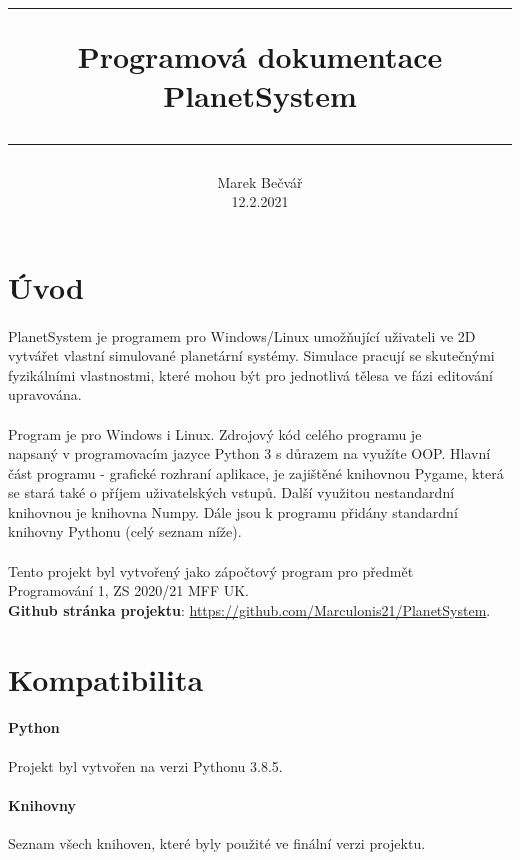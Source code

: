 \documentclass[a4paper, 12pt]{article}
\title{
        \vspace{1in}
        \rule{\linewidth}{0.5pt}
		\usefont{OT1}{bch}{b}{n}
        \huge Programová dokumentace \\PlanetSystem\\
        \vspace{-10pt}
        \rule{\linewidth}{1pt}
}
\author{
		\normalfont\normalsize
        Marek Bečvář\\[-3pt]\normalsize
        12.2.2021
}
\date{}
\begin{document}
\maketitle 
\newpage

\tableofcontents
\newpage

\section{Úvod}
\paragraph{}
PlanetSystem je programem pro Windows/Linux umožňující uživateli ve 2D vytvářet
vlastní simulované planetární systémy. Simulace pracují se skutečnými
fyzikálními vlastnostmi, které mohou být pro jednotlivá tělesa ve fázi
editování upravována.
\\\\
Program je pro Windows i Linux. Zdrojový kód celého programu je \\napsaný v
programovacím jazyce Python 3 s důrazem na využíte OOP.  Hlavní část programu -
grafické rozhraní aplikace, je zajištěné knihovnou Pygame, která se stará také
o příjem uživatelských vstupů. Další využitou nestandardní knihovnou je
knihovna Numpy. Dále jsou k programu přidány standardní knihovny Pythonu (celý
seznam níže).  
\\\\
Tento projekt byl vytvořený jako zápočtový program pro předmět 
\\Programování 1, ZS 2020/21 MFF UK. 
\\
\textbf{Github stránka projektu}:
\url{https://github.com/Marculonis21/PlanetSystem}.

\section{Kompatibilita}
\paragraph{Python} Projekt byl vytvořen na verzi Pythonu 3.8.5. 

\paragraph{Knihovny} Seznam všech knihoven, které byly použité ve finální verzi
projektu.
\end{document}
